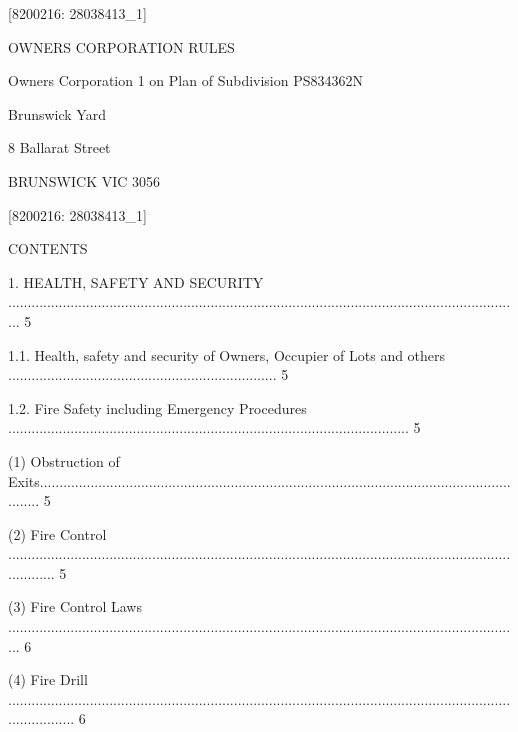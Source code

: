 \documentclass{article}
\begin{document}



{\fontsize{7.02}{1}[8200216: 28038413\_1] }

{\fontsize{13.98}{1}OWNERS CORPORATION RULES }

{\fontsize{10.98}{1}Owners Corporation 1 on Plan of Subdivision PS834362N }

{\fontsize{10.98}{1}Brunswick Yard }

{\fontsize{10.98}{1}8 Ballarat Street }

{\fontsize{10.98}{1}BRUNSWICK VIC 3056 }

\newpage
















{\fontsize{7.02}{1}[8200216: 28038413\_1] }


{\fontsize{10.02}{1}CONTENTS }

{\fontsize{9.99}{1}1. HEALTH, SAFETY AND SECURITY .................................................................................................................................... 5 }

{\fontsize{9.99}{1}1.1. Health, safety and security of Owners, Occupier of Lots and others ..................................................................... 5 }

{\fontsize{9.99}{1}1.2. Fire Safety including Emergency Procedures ....................................................................................................... 5 }

{\fontsize{9.962}{1}(1) Obstruction of Exits................................................................................................................................. 5 }

{\fontsize{9.962}{1}(2) Fire Control ............................................................................................................................................. 5 }

{\fontsize{9.962}{1}(3) Fire Control Laws .................................................................................................................................... 6 }

{\fontsize{9.962}{1}(4) Fire Drill .................................................................................................................................................. 6 }
\end{document}
